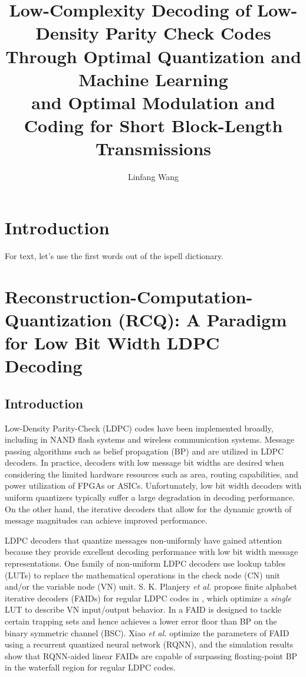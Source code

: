 \documentclass [PhD] {uclathes}
\title          {Low-Complexity Decoding of Low-Density Parity Check Codes \\
                Through Optimal Quantization and Machine Learning \\
                and Optimal Modulation and Coding for Short Block-Length Transmissions}
\author         {Linfang Wang}
\begin{document}
\makeintropages

%
%

\chapter{Introduction}

For text, let's use the first words out of the ispell dictionary.



\chapter{Reconstruction-Computation-Quantization (RCQ): A Paradigm for Low Bit Width LDPC Decoding}


\section{Introduction}
Low-Density Parity-Check  (LDPC) codes \cite{GallagerPhD1963} have been implemented broadly, including in NAND flash systems and wireless communication systems. Message passing algorithms such as belief propagation (BP) and \minsum are utilized in LDPC decoders. In practice, decoders with low message bit widths are desired when considering the limited hardware resources such as area, routing capabilities, and power utilization of FPGAs or ASICs. Unfortunately, low bit width decoders with uniform quantizers typically suffer a large degradation in decoding performance\cite{-_Lee2005-MIMQBP}. On the other hand, the iterative decoders that allow for the dynamic growth of message magnitudes can achieve improved performance\cite{Zhang2014-ib}.




LDPC decoders that quantize messages  non-uniformly have gained attention because they provide excellent decoding performance with low bit width message representations. 
One family of non-uniform LDPC decoders use lookup tables (LUTs) to replace the mathematical operations in the check node (CN) unit  and/or the variable node (VN) unit. 
S. K. Planjery \emph{et al.} propose finite alphabet iterative decoders (FAIDs) for regular LDPC codes in \cite{Planjery2013-FAIDI,Declercq2013-FAIDII},  which optimize a \textit{single} LUT to describe VN input/output behavior. In \cite{Planjery2013-FAIDI} a FAID is  designed to tackle certain trapping sets and hence achieves a lower error floor than BP on the binary symmetric channel (BSC).  Xiao \emph{et al.} optimize the parameters of FAID using a recurrent quantized neural network (RQNN)\cite{Xiao2019-RNNFIAD,Xiao2020-RNNFAID}, and the simulation results show that RQNN-aided linear FAIDs are capable of surpassing floating-point BP in the waterfall region for regular LDPC codes.
\end{document}
